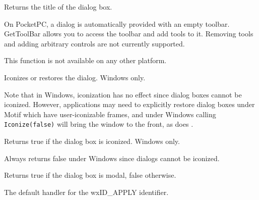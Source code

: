 
Returns the title of the dialog box.


\label{wxdialoggettoolbar}


On PocketPC, a dialog is automatically provided with an empty toolbar. GetToolBar
allows you to access the toolbar and add tools to it. Removing tools and adding
arbitrary controls are not currently supported.

This function is not available on any other platform.


\label{wxdialogiconized}


Iconizes or restores the dialog. Windows only.




Note that in Windows, iconization has no effect since dialog boxes cannot be
iconized. However, applications may need to explicitly restore dialog
boxes under Motif which have user-iconizable frames, and under Windows
calling {\tt Iconize(false)} will bring the window to the front, as does
.


\label{wxdialogisiconized}


Returns true if the dialog box is iconized. Windows only.


Always returns false under Windows since dialogs cannot be iconized.


\label{wxdialogismodal}


Returns true if the dialog box is modal, false otherwise.


\label{wxdialogonapply}


The default handler for the wxID\_APPLY identifier.


